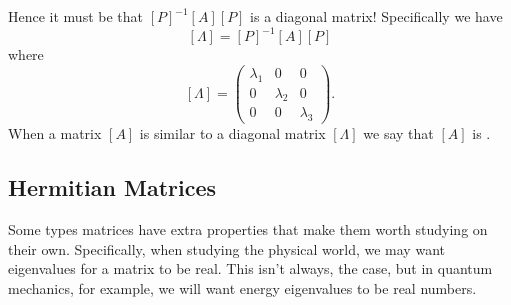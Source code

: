             Hence it must be that $[P]^{-1}[A][P]$ is a diagonal matrix! Specifically we have
            \[
            [\Lambda]=[P]^{-1}[A][P]
            \]
            where 
            \[
            [\Lambda] = \begin{pmatrix} \lambda_1 & 0 & 0 \\ 0 & \lambda_2 & 0 \\ 0 & 0 & \lambda_3 \end{pmatrix}.
            \]
            When a matrix $[A]$ is similar to a diagonal matrix $[\Lambda]$ we say that $[A]$ is .
            
            \subsection{Hermitian Matrices}
            Some types matrices have extra properties that make them worth studying on their own.  Specifically, when studying the physical world, we may want eigenvalues for a matrix to be real.  This isn't always, the case, but in quantum mechanics, for example, we will want energy eigenvalues to be real numbers.
            
